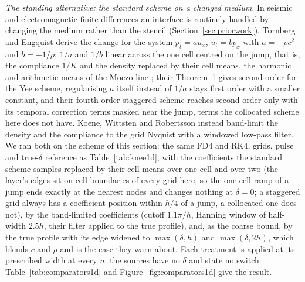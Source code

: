 \documentclass[11pt]{amsart}
\theoremstyle{definition}
\theoremstyle{remark}
\newcommand{\para}[1]{\par\smallskip\noindent\textit{#1}.\enspace}
\begin{document}
\para{The standing alternative: the standard scheme on a changed medium}
In seismic and electromagnetic finite differences an interface is
routinely handled by changing the medium rather than the stencil
(Section~\ref{sec:priorwork}). Tornberg and Engquist
\cite{TornbergEngquist2006} derive the change for the system
$p_t = a u_x$, $u_t = b p_x$ with $a = -\rho c^2$ and $b = -1/\rho$:
$1/a$ and $1/b$ linear across the one cell centred on the jump, that is,
the compliance $1/K$ and the density replaced by their cell means, the
harmonic and arithmetic means of the Moczo line \cite{MoczoEtAl2002};
their Theorem~1 gives second order for the Yee scheme, regularising $a$
itself instead of $1/a$ stays first order with a smaller constant, and
their fourth-order staggered scheme reaches second order only with its
temporal correction terms masked near the jump, terms the collocated
scheme here does not have. Koene, Wittsten and Robertsson
\cite{KoeneWittstenRobertsson2022} instead band-limit the density and
the compliance to the grid Nyquist with a windowed low-pass filter. We
ran both on the scheme of this section: the same FD4 and RK4, grids,
pulse and true-$\delta$ reference as Table~\ref{tab:knee1d}, with the
coefficients the standard scheme samples replaced by their cell means
over one cell and over two (the layer's edges sit on cell boundaries of
every grid here, so the one-cell ramp of a jump ends exactly at the
nearest nodes and changes nothing at $\delta = 0$; a staggered grid
always has a coefficient position within $h/4$ of a jump, a collocated
one does not), by the band-limited coefficients (cutoff $1.1\pi/h$,
Hanning window of half-width $2.5h$, their filter applied to the true
profile), and, as the coarse bound, by the true profile with its edge
widened to $\max(\delta, h)$ and $\max(\delta, 2h)$, which blends $c$
and $\rho$ and is the case they warn about. Each treatment is applied at
its prescribed width at every $n$: the sources have no $\delta$ and state
no switch. Table~\ref{tab:comparators1d} and
Figure~\ref{fig:comparators1d} give the result.
\end{document}
